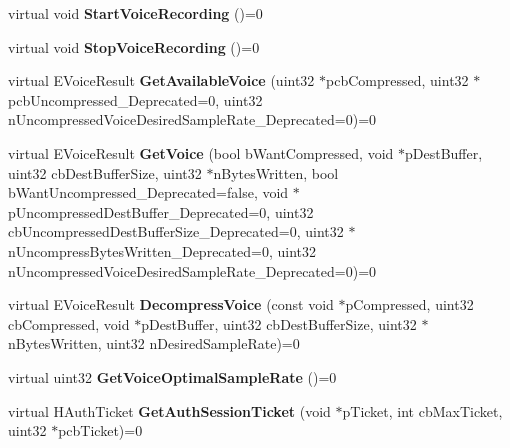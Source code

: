 \begin{DoxyCompactItemize}
\item 
\mbox{\label{class_i_steam_user_a7f2e7fa09cf2fc1da25ff8601b917978}} 
virtual void {\bfseries Start\+Voice\+Recording} ()=0
\item 
\mbox{\label{class_i_steam_user_a8c66f7f9a4b5c81ae16e1db7be286bff}} 
virtual void {\bfseries Stop\+Voice\+Recording} ()=0
\item 
\mbox{\label{class_i_steam_user_a83851fd1e3457c3752ddddd9d848ede4}} 
virtual E\+Voice\+Result {\bfseries Get\+Available\+Voice} (uint32 $\ast$pcb\+Compressed, uint32 $\ast$pcb\+Uncompressed\+\_\+\+Deprecated=0, uint32 n\+Uncompressed\+Voice\+Desired\+Sample\+Rate\+\_\+\+Deprecated=0)=0
\item 
\mbox{\label{class_i_steam_user_a6c7c2894e61f654f37ab0e628be1438b}} 
virtual E\+Voice\+Result {\bfseries Get\+Voice} (bool b\+Want\+Compressed, void $\ast$p\+Dest\+Buffer, uint32 cb\+Dest\+Buffer\+Size, uint32 $\ast$n\+Bytes\+Written, bool b\+Want\+Uncompressed\+\_\+\+Deprecated=false, void $\ast$p\+Uncompressed\+Dest\+Buffer\+\_\+\+Deprecated=0, uint32 cb\+Uncompressed\+Dest\+Buffer\+Size\+\_\+\+Deprecated=0, uint32 $\ast$n\+Uncompress\+Bytes\+Written\+\_\+\+Deprecated=0, uint32 n\+Uncompressed\+Voice\+Desired\+Sample\+Rate\+\_\+\+Deprecated=0)=0
\item 
\mbox{\label{class_i_steam_user_ae351f90e7f95f945baeef5d7cf7c6760}} 
virtual E\+Voice\+Result {\bfseries Decompress\+Voice} (const void $\ast$p\+Compressed, uint32 cb\+Compressed, void $\ast$p\+Dest\+Buffer, uint32 cb\+Dest\+Buffer\+Size, uint32 $\ast$n\+Bytes\+Written, uint32 n\+Desired\+Sample\+Rate)=0
\item 
\mbox{\label{class_i_steam_user_a7f0b1a2069a471b88559995432ed5a01}} 
virtual uint32 {\bfseries Get\+Voice\+Optimal\+Sample\+Rate} ()=0
\item 
\mbox{\label{class_i_steam_user_a5ffd1e0131e3a74d961f6014a823a4cc}} 
virtual H\+Auth\+Ticket {\bfseries Get\+Auth\+Session\+Ticket} (void $\ast$p\+Ticket, int cb\+Max\+Ticket, uint32 $\ast$pcb\+Ticket)=0
\item 
\mbox{\label{class_i_steam_user_a43f76c4da6eda398d1838a58f1ec4374}} 

\end{DoxyCompactItemize}
